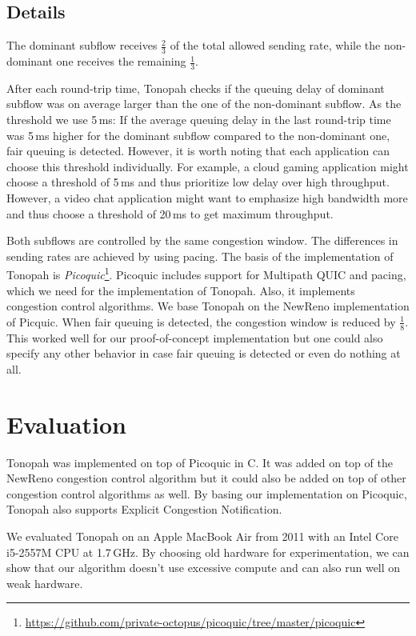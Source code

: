 \documentclass[conference]{IEEEtran}
\begin{document}
\subsection{Details}

The dominant subflow receives $\frac{2}{3}$ of the total allowed sending rate, while the non-dominant one receives the remaining $\frac{1}{3}$. 

After each round-trip time, Tonopah checks if the queuing delay of dominant subflow was on average larger than the one of the non-dominant subflow. As the threshold we use 5\,ms: If the average queuing delay in the last round-trip time was 5\,ms higher for the dominant subflow compared to the non-dominant one, fair queuing is detected. However, it is worth noting that each application can choose this threshold individually. For example, a cloud gaming application might choose a threshold of 5\,ms and thus prioritize low delay over high throughput. However, a video chat application might want to emphasize high bandwidth more and thus choose a threshold of 20\,ms to get maximum throughput. 

Both subflows are controlled by the same congestion window. The differences in sending rates are achieved by using pacing. 
The basis of the implementation of Tonopah is \textit{Picoquic}\footnote{\url{https://github.com/private-octopus/picoquic/tree/master/picoquic}}. 
Picoquic includes support for Multipath QUIC and pacing, which we need for the implementation of Tonopah. Also, it implements congestion control algorithms. 
We base Tonopah on the NewReno implementation of Picquic. When fair queuing is detected, the congestion window is reduced by $\frac{1}{8}$. 
This worked well for our proof-of-concept implementation but one could also specify any other behavior in case fair queuing is detected or even do nothing at all. 

\section{Evaluation}

Tonopah was implemented on top of Picoquic in C. It was added on top of the NewReno congestion control algorithm but it could also be added on top of other 
congestion control algorithms as well. By basing our implementation on Picoquic, Tonopah also supports Explicit Congestion Notification. 

We evaluated Tonopah on an Apple MacBook Air from 2011 with an Intel Core i5-2557M CPU at 1.7\,GHz. 
By choosing old hardware for experimentation, we can show that our algorithm doesn't use excessive compute and can also run well on weak hardware. 
\end{document}
